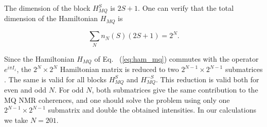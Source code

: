 The dimension of the block $H_{MQ}^S$ is $2S+1$. One can verify \cite{lab:mq_nmr_dyn_in_nanopores_2009} that the total dimension of the Hamiltonian $H_{MQ}$ is 

\begin{equation}
    \sum\limits_N n_N(S)(2S+1) = 2^N.
\end{equation}

Since the Hamiltonian $H_{MQ}$ of Eq.   ~(\ref{eq:ham_mq}) commutes with the operator $e^{i\pi I_z}$, the $2^N\times2^N$ Hamiltonian matrix is reduced to two $2^{N-1}\times2^{N-1}$ submatrices \cite{lab:mq_nmr_dyn_in_nanopores_2009}. The same is valid for all blocks $H_{MQ}^S$ and $H_{MQ}^{-S}$. This reduction is valid both for even and odd $N$. For odd $N$, both submatrices give the same contribution to the MQ NMR coherences, and one should solve the problem using only one $2^{N-1}\times2^{N-1}$ submatrix and double the obtained intensities. In our calculations we take $N=201$.
